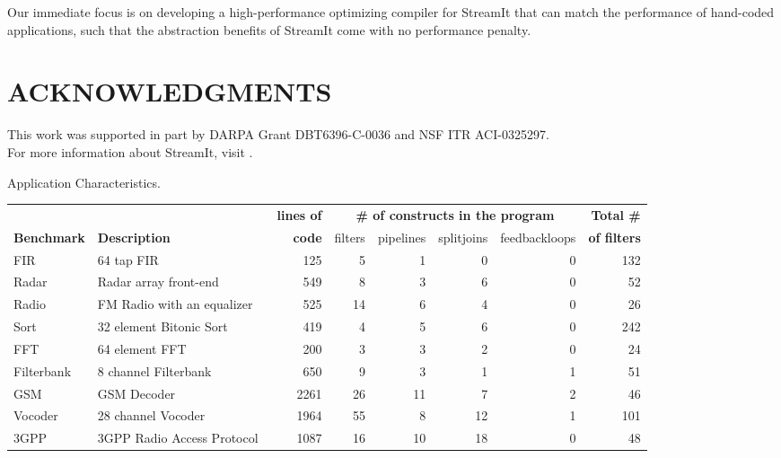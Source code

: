 \documentclass[final]{ijpp}
\begin{document}
Our  immediate focus  is on  developing a  high-performance optimizing
compiler  for StreamIt that  can match  the performance  of hand-coded
applications, such that the abstraction benefits of StreamIt come with
no performance penalty.

\section*{ACKNOWLEDGMENTS}
This work was supported in  part by DARPA Grant DBT6396-C-0036 and NSF
ITR ACI-0325297.\\ For more information about StreamIt, visit \streamiturl.


  

\clearpage
\begin{table}
\caption{Application Characteristics.}
\label{tab:benchmarks}
\end{table}
\clearpage
\begin{table}
\begin{tabular}{l|l||r||r|r|r|r||r} \hline
 & & {\bf lines of} & \multicolumn{4}{|c||}{\bf \# of constructs in
   the program} & {\bf Total \#} \\ \cline{4-7}
{\bf Benchmark} & {\bf Description} & {\bf code} & filters & pipelines
& splitjoins & feedbackloops & {\bf of filters}
\\
\hline \hline
FIR & 64 tap FIR & 
125 & 5 & 1 & 0 & 0 & 132
\\ \hline
Radar & Radar array front-end\cite{pca} & 
549 & 8 & 3 & 6 & 0 & 52
\\ \hline
Radio & FM Radio with an equalizer & 
525 & 14 & 6 & 4 & 0 & 26
\\ \hline
Sort & 32 element Bitonic Sort & 
419 & 4 & 5 & 6 & 0 & 242
\\  \hline
FFT & 64 element FFT & 
200 & 3 & 3 & 2 & 0 & 24
\\  \hline
Filterbank & 8 channel Filterbank & 
650 & 9 & 3 & 1 & 1 & 51
\\  \hline
GSM & GSM Decoder & 
2261 & 26 & 11 & 7 & 2 & 46
\\ \hline
Vocoder & 28 channel Vocoder~\cite{seneff80}&  
1964 & 55 & 8 & 12 & 1 & 101
\\ \hline
3GPP & 3GPP Radio Access Protocol~\cite{3gpp} &  
1087 & 16 & 10 & 18 & 0 & 48
\\ \hline
\end{tabular}
\end{table}
\end{document}
